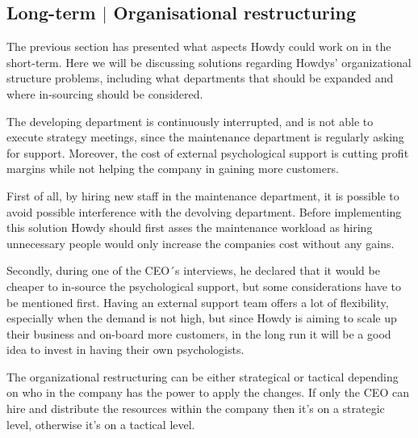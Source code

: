 \subsection{Long-term $|$ Organisational restructuring}

The previous section has presented what aspects Howdy could work on in the short-term. Here we will be discussing solutions regarding Howdys' organizational structure problems, including what departments that should be expanded and where in-sourcing should be considered. 

\noindent The developing department is continuously interrupted, and is not able to execute strategy meetings, since the maintenance department is regularly asking for support. Moreover, the cost of external psychological support is cutting profit margins while not helping the company in gaining more customers.

\noindent First of all, by hiring new staff in the maintenance department, it is possible to avoid possible interference with the devolving department. Before implementing this solution Howdy should first asses the maintenance workload as hiring unnecessary people would only increase the companies cost without any gains.


\noindent Secondly, during one of the CEO´s interviews, he declared that it would be cheaper to in-source the psychological support, but some considerations have to be mentioned first. Having an external support team offers a lot of flexibility, especially when the demand is not high, but since Howdy is aiming to scale up their business and on-board more customers, in the long run it will be a good idea to invest in having their own psychologists. 

\noindent The organizational restructuring can be either strategical or tactical depending on who in the company has the power to apply the changes. If only the CEO can hire and distribute the resources within the company then it's on a strategic level, otherwise it's on a tactical level. 
 




